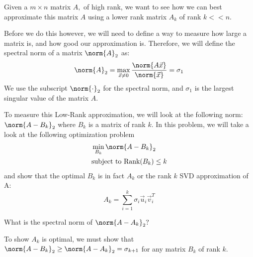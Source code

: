 

Given a $m \times n$ matrix $A,$ of high rank, we want to see how we can best approximate this matrix $A$ using a lower rank matrix $A_{k}$ of rank $k << n.$ 

Before we do this however, we will need to define a way to measure how large a matrix is, and how good our approximation is. Therefore, we will define the spectral norm of a matrix $\norm{A}_{2}$ as:
\begin{equation}
  \norm{A}_{2} = \max_{\vec{x} \neq 0} \frac{\norm{A \vec{x}}}{\norm{\vec{x}}} = \sigma_{1}
\end{equation}
We use the subscript $\norm{\cdot}_{2}$ for the spectral norm, and $\sigma_{1}$ is the largest singular value of the matrix $A.$

To measure this Low-Rank approximation, we will look at the following norm:
$\norm{A - B_{k}}_{2}$
where $B_{k}$ is a matrix of rank $k.$ In this problem, we will take a look at the following optimization problem
\begin{align*}
  &\min_{B_{k}}{\norm{A - B_{k}}_{2}} \\
  &\text{subject to} \ \text{Rank}(B_k) \leq k
\end{align*}
and show that the optimal $B_{k}$ is in fact $A_{k}$ or the rank $k$ SVD approximation of A:
\begin{equation}
  A_{k} = \sum\limits_{i = 1}^{k} \sigma_{i} \vec{u}_{i} \vec{v}_{i}^{T}
\end{equation}


\begin{enumerate}
  \qitem What is the spectral norm of $\norm{A - A_{k}}_{2}?$

\end{enumerate}

To show $A_{k}$ is optimal, we must show that $\norm{A - B_{k}}_{2} \geq \norm{A - A_{k}}_{2} = \sigma_{k+1}$ for any matrix $B_{k}$ of rank $k.$

